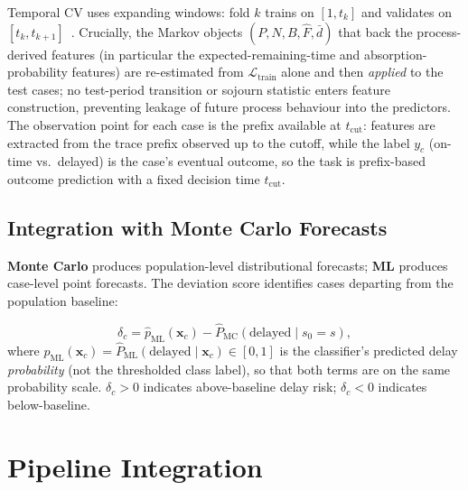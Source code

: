 Temporal CV uses expanding windows: fold $k$ trains on $[1, t_k]$ and
validates on $[t_k, t_{k+1}]$~\cite{tashman2000out, hyndman2021forecasting}.
Crucially, the Markov objects $(P, N, B, \hat{F}, \bar{d})$ that back the
process-derived features (in particular the expected-remaining-time and
absorption-probability features) are re-estimated from
$\mathcal{L}_{\text{train}}$ alone and then \emph{applied} to the test cases;
no test-period transition or sojourn statistic enters feature construction,
preventing leakage of future process behaviour into the predictors. The
observation point for each case is the prefix available at $t_{\text{cut}}$:
features are extracted from the trace prefix observed up to the cutoff, while
the label $y_c$ (on-time vs.\ delayed) is the case's eventual outcome, so the
task is prefix-based outcome prediction with a fixed decision time
$t_{\text{cut}}$.


\subsection{Integration with Monte Carlo Forecasts}
\label{sec:ml-integration}

\textbf{Monte Carlo} produces population-level distributional forecasts;
\textbf{ML} produces case-level point forecasts. The deviation score
identifies cases departing from the population baseline:

\begin{definition}
\label{def:deviation}
\begin{equation}
\label{eq:deviation}
\delta_c = \hat{p}_{\text{ML}}(\mathbf{x}_c) - \hat{P}_{\text{MC}}(\text{delayed} \mid s_0 = s),
\end{equation}
where $\hat{p}_{\text{ML}}(\mathbf{x}_c) = \hat{P}_{\text{ML}}(\text{delayed}
\mid \mathbf{x}_c) \in [0,1]$ is the classifier's predicted delay
\emph{probability} (not the thresholded class label), so that both terms are
on the same probability scale.
$\delta_c > 0$ indicates above-baseline delay risk;
$\delta_c < 0$ indicates below-baseline.
\end{definition}


\section{Pipeline Integration}
\label{sec:integration}

